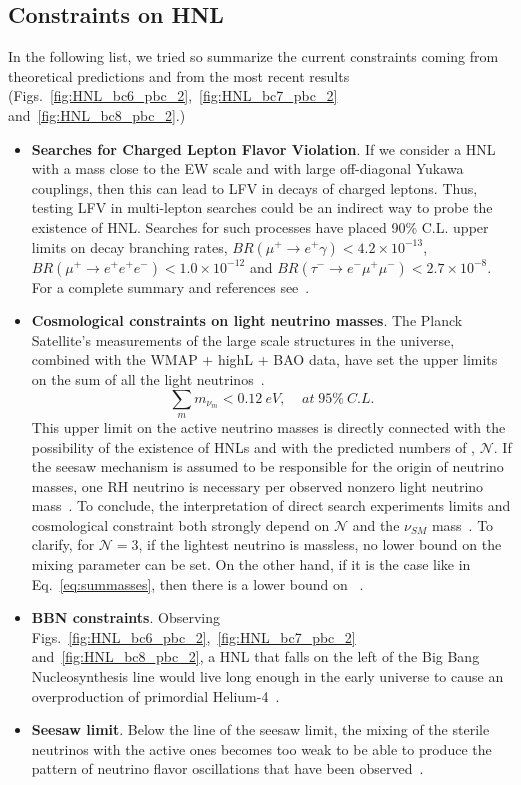 \subsection{Constraints on HNL}
In the following list, we tried so summarize the current constraints
coming from theoretical predictions and from the most recent results (Figs.~\ref{fig:HNL_bc6_pbc_2},~\ref{fig:HNL_bc7_pbc_2}
and~\ref{fig:HNL_bc8_pbc_2}.)
\begin{itemize}
\item \textbf{Searches for Charged Lepton Flavor Violation}. If we consider a HNL with a
  mass close to the EW scale and with large off-diagonal Yukawa couplings,
  then this can lead to LFV in decays of charged leptons. Thus,
  testing LFV in multi-lepton searches could be an indirect way to
  probe the existence of HNL. Searches for such processes have
  placed 90\% C.L. upper limits on decay branching rates, \ie
  $BR(\mu^+\rightarrow e^+\gamma) < 4.2\times 10^{-13}$,
  $BR(\mu^+\rightarrow e^+e^+e^-) < 1.0\times 10^{-12}$ and
  $BR(\tau^-\rightarrow e^-\mu^+\mu^-) < 2.7\times 10^{-8}$. For a 
  complete summary and references see~\cite{Pascoli_2019}.
\item \textbf{Cosmological constraints on light neutrino masses}. The Planck
  Satellite's measurements of the large scale structures in the
  universe, combined with the WMAP + highL + BAO data, have set the
  upper limits on the sum of all the light
  neutrinos~\cite{Aghanim:2018eyx}.
\begin{equation}
\label{eq:summasses}
\sum_{m} m_{\nu_m} < 0.12 \: eV, \;\;\;\; at \;95\% \: C.L.
\end{equation}
This upper limit on the active neutrino masses is directly connected
with the possibility of the existence of HNLs and with the predicted
numbers of \hnl, $\mathcal{N}$.
If the seesaw mechanism is assumed to be responsible for the origin of neutrino masses,
one RH neutrino is necessary per observed nonzero light
neutrino mass~\cite{Alekhin_2016}.
To conclude, the interpretation of direct search experiments limits and cosmological constraint both strongly
depend on $\mathcal{N}$ and the $\nu_{SM}$
mass~\cite{DREWES2017250,drewes2015theoretical}. To clarify, for
$\mathcal{N}=3$, if the lightest neutrino is massless, no
lower bound on the mixing parameter \mixpar can be set.
On the other hand, if it is the case like in Eq.~\ref{eq:summasses}, then there is a lower
bound on \mixpar~\cite{DREWES2017250}.
\item \textbf{BBN constraints}. Observing
  Figs.~\ref{fig:HNL_bc6_pbc_2},~\ref{fig:HNL_bc7_pbc_2}
  and~\ref{fig:HNL_bc8_pbc_2}, a HNL that falls on the left of the
  Big Bang Nucleosynthesis line would live long enough in
  the early universe to cause an overproduction of primordial
  Helium-4~\cite{Ruchayskiy_2012}.
\item \textbf{Seesaw limit}. Below the line of the seesaw limit, the
  mixing of the sterile neutrinos with the active ones becomes too
  weak to be able to produce the pattern of neutrino flavor oscillations that have been observed~\cite{Canetti_2010}. 
\end{itemize}
\clearpage
